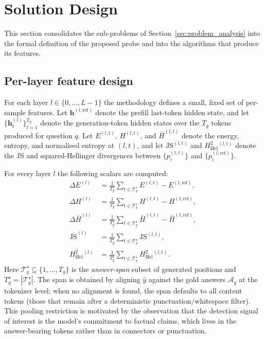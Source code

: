 \section{Solution Design}
\label{sec:solution_design}

This section consolidates the sub-problems of Section~\ref{sec:problem_analysis}
into the formal definition of the proposed probe and into the algorithms
that produce its features.

\subsection{Per-layer feature design}
\label{subsec:feature_design}

For each layer $l \in \{0, \ldots, L-1\}$ the methodology defines a
small, fixed set of per-sample features. Let $\mathbf{h}^{(l,\mathrm{ref})}$
denote the prefill last-token hidden state, and let
$\{\mathbf{h}_t^{(l)}\}_{t=1}^{T_g}$ denote the generation-token hidden
states over the $T_g$ tokens produced for question $q$. Let
$E^{(l,t)}$, $H^{(l,t)}$, and $\bar{H}^{(l,t)}$ denote the energy, entropy,
and normalised entropy at $(l,t)$, and let
$\mathrm{JS}^{(l,t)}$ and $H^2_{\mathrm{Hel}}{}^{(l,t)}$ denote the JS and
squared-Hellinger divergences between $\{p_i^{(l,t)}\}$ and
$\{p_i^{(l,\mathrm{ref})}\}$.

For every layer $l$ the following scalars are computed:
\begin{align}
    \Delta E^{(l)}
        &= \tfrac{1}{T_g^\star} \!\sum_{t \in \mathcal{T}_q^\star}\! E^{(l,t)} - E^{(l,\mathrm{ref})}, \\
    \Delta H^{(l)}
        &= \tfrac{1}{T_g^\star} \!\sum_{t \in \mathcal{T}_q^\star}\! H^{(l,t)} - H^{(l,\mathrm{ref})}, \\
    \Delta \bar{H}^{(l)}
        &= \tfrac{1}{T_g^\star} \!\sum_{t \in \mathcal{T}_q^\star}\! \bar{H}^{(l,t)} - \bar{H}^{(l,\mathrm{ref})}, \\
    \overline{\mathrm{JS}}^{(l)}
        &= \tfrac{1}{T_g^\star} \!\sum_{t \in \mathcal{T}_q^\star}\! \mathrm{JS}^{(l,t)}, \\
    \overline{H^2_{\mathrm{Hel}}}{}^{(l)}
        &= \tfrac{1}{T_g^\star} \!\sum_{t \in \mathcal{T}_q^\star}\! H^2_{\mathrm{Hel}}{}^{(l,t)}.
    \label{eq:per_layer_features}
\end{align}
Here $\mathcal{T}_q^\star \subseteq \{1, \ldots, T_g\}$ is the
\emph{answer-span} subset of generated positions and $T_g^\star =
|\mathcal{T}_q^\star|$. The span is obtained by aligning $\hat{y}$ against
the gold answers $\mathcal{A}_q$ at the tokenizer level; when no
alignment is found, the span defaults to all content tokens (those that
remain after a deterministic punctuation/whitespace filter). This pooling
restriction is motivated by the observation that the detection signal of
interest is the model's commitment to factual claims, which lives in the
answer-bearing tokens rather than in connectors or punctuation.

